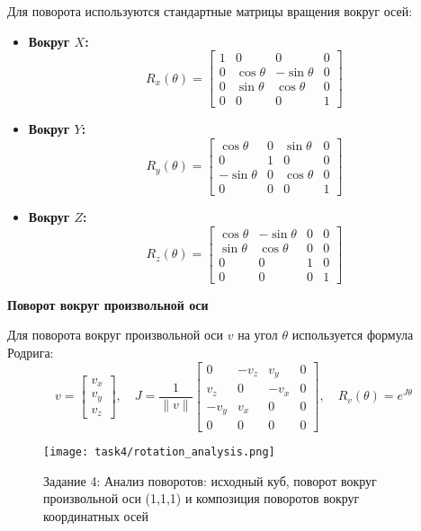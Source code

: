 Для поворота используются стандартные матрицы вращения вокруг осей:
\begin{itemize}
    \item \textbf{Вокруг $X$:}
    \[
    R_x(\theta) = \begin{bmatrix}
        1 & 0 & 0 & 0 \\
        0 & \cos\theta & -\sin\theta & 0 \\
        0 & \sin\theta & \cos\theta & 0 \\
        0 & 0 & 0 & 1
    \end{bmatrix}
    \]
    \item \textbf{Вокруг $Y$:}
    \[
    R_y(\theta) = \begin{bmatrix}
        \cos\theta & 0 & \sin\theta & 0 \\
        0 & 1 & 0 & 0 \\
        -\sin\theta & 0 & \cos\theta & 0 \\
        0 & 0 & 0 & 1
    \end{bmatrix}
    \]
    \item \textbf{Вокруг $Z$:}
    \[
    R_z(\theta) = \begin{bmatrix}
        \cos\theta & -\sin\theta & 0 & 0 \\
        \sin\theta & \cos\theta & 0 & 0 \\
        0 & 0 & 1 & 0 \\
        0 & 0 & 0 & 1
    \end{bmatrix}
    \]
\end{itemize}

\textbf{Поворот вокруг произвольной оси}

Для поворота вокруг произвольной оси $v$ на угол $\theta$ используется формула Родрига:
\[
v = \begin{bmatrix} v_x \\ v_y \\ v_z \end{bmatrix}, \quad J = \frac{1}{\|v\|} \begin{bmatrix}
0 & -v_z & v_y & 0 \\
v_z & 0 & -v_x & 0 \\
-v_y & v_x & 0 & 0 \\
0 & 0 & 0 & 0
\end{bmatrix}, \quad R_v(\theta) = e^{J\theta}
\]

\begin{figure}[h!]
    \centering
    \texttt{[image: task4/rotation\_analysis.png]}
    \caption{Задание 4: Анализ поворотов: исходный куб, поворот вокруг произвольной оси (1,1,1) и композиция поворотов вокруг координатных осей}
\end{figure}

